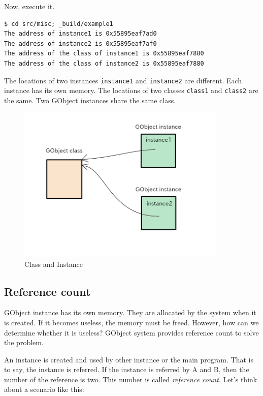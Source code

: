 Now, execute it.

\begin{lstlisting}
$ cd src/misc; _build/example1
The address of instance1 is 0x55895eaf7ad0
The address of instance2 is 0x55895eaf7af0
The address of the class of instance1 is 0x55895eaf7880
The address of the class of instance2 is 0x55895eaf7880
\end{lstlisting}

The locations of two instances \passthrough{\lstinline!instance1!} and
\passthrough{\lstinline!instance2!} are different. Each instance has its
own memory. The locations of two classes
\passthrough{\lstinline!class1!} and \passthrough{\lstinline!class2!}
are the same. Two GObject instances share the same class.

\begin{figure}
\centering
\includegraphics[width=10cm,height=7.5cm]{../image/class_instance.png}
\caption{Class and Instance}
\end{figure}

\subsection{Reference count}\label{reference-count}

GObject instance has its own memory. They are allocated by the system
when it is created. If it becomes useless, the memory must be freed.
However, how can we determine whether it is useless? GObject system
provides reference count to solve the problem.

An instance is created and used by other instance or the main program.
That is to say, the instance is referred. If the instance is referred by
A and B, then the number of the reference is two. This number is called
\emph{reference count}. Let's think about a scenario like this:

